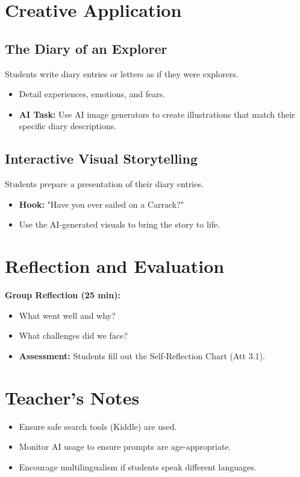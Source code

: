 \documentclass[11pt, a4paper]{article}
\begin{document}
\section{Creative Application}
\subsection{The Diary of an Explorer}
Students write diary entries or letters as if they were explorers.
\begin{itemize}
    \item Detail experiences, emotions, and fears.
    \item \textbf{AI Task:} Use AI image generators to create illustrations that match their specific diary descriptions.
\end{itemize}

\subsection{Interactive Visual Storytelling}
Students prepare a presentation of their diary entries.
\begin{itemize}
    \item \textbf{Hook:} "Have you ever sailed on a Carrack?"
    \item Use the AI-generated visuals to bring the story to life.
\end{itemize}

\newpage
\section{Reflection and Evaluation}
\textbf{Group Reflection (25 min):}
\begin{itemize}
    \item What went well and why?
    \item What challenges did we face?
    \item \textbf{Assessment:} Students fill out the Self-Reflection Chart (Att 3.1).
\end{itemize}

\section*{Teacher's Notes}
\begin{itemize}
    \item Ensure safe search tools (Kiddle) are used.
    \item Monitor AI usage to ensure prompts are age-appropriate.
    \item Encourage multilingualism if students speak different languages.
\end{itemize}
\end{document}
